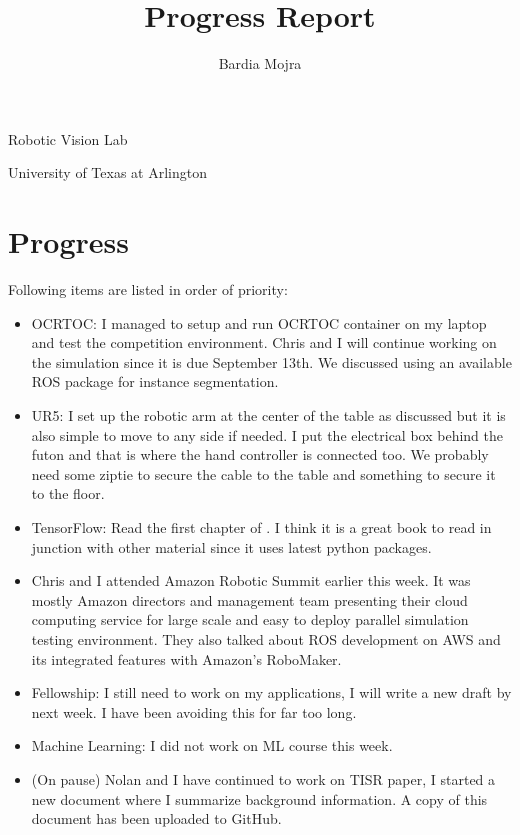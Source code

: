 \documentclass[11pt]{article}
\title{Progress Report}
\author{Bardia Mojra}
\begin{document}
\maketitle
\thispagestyle{empty}

\begin{center}
	\bigskip
	\bigskip
	Robotic Vision Lab

	University of Texas at Arlington
\end{center}

\newpage

\section{Progress}
Following items are listed in order of priority:
\begin{itemize}

	\item OCRTOC: I managed to setup and run OCRTOC container on my laptop and test the competition environment. Chris and I will continue working on the simulation since it is due September 13th. We discussed using an available ROS package for instance segmentation.

	\item UR5: I set up the robotic arm at the center of the table as discussed but it is also simple to move to any side if needed. I put the electrical box behind the futon and that is where the hand controller is connected too. We probably need some ziptie to secure the cable to the table and something to secure it to the floor.

	\item TensorFlow: Read the first chapter of \cite{HandsOn_CV_w_tf2}. I think it is a great book to read in junction with other material since it uses latest python packages.

	\item Chris and I attended Amazon Robotic Summit earlier this week. It was mostly Amazon directors and management team presenting their cloud computing service for large scale and easy to deploy parallel simulation testing environment. They also talked about ROS development on AWS and its integrated features with Amazon's RoboMaker.

	\item Fellowship: I still need to work on my applications, I will write a new draft by next week. I have been avoiding this for far too long.

	\item Machine Learning: I did not work on ML course this week.

	\item (On pause) Nolan and I have continued to work on TISR paper, I started a new document where I summarize background information. A copy of this document has been uploaded to GitHub.


\end{itemize}
\end{document}

